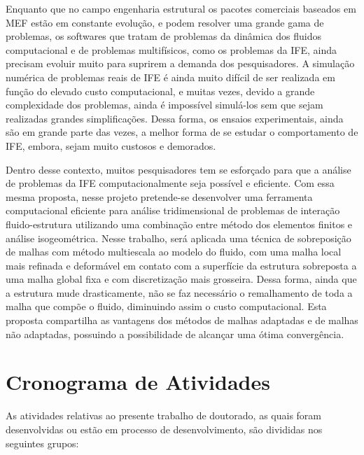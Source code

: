 \documentclass[tese_patricia.tex]{subfiles}
\begin{document}
Enquanto que no campo engenharia estrutural os pacotes comerciais baseados em MEF estão em constante evolução, e podem resolver uma grande gama de problemas, os softwares que tratam de problemas da dinâmica dos fluidos computacional e de problemas multifísicos, como os problemas da IFE, ainda precisam evoluir muito para suprirem a demanda dos pesquisadores. A simulação numérica de problemas reais de IFE é ainda muito difícil de ser realizada em função do elevado custo computacional, e muitas vezes, devido a grande complexidade dos problemas, ainda é impossível simulá-los sem que sejam realizadas grandes simplificações. Dessa forma, os ensaios experimentais, ainda são em grande parte das vezes, a melhor forma de se estudar o comportamento de IFE, embora, sejam muito custosos e demorados.

Dentro desse contexto, muitos pesquisadores tem se esforçado para que a análise de problemas da IFE computacionalmente seja possível e eficiente. Com essa mesma proposta, nesse projeto pretende-se desenvolver uma ferramenta computacional eficiente para análise tridimensional de problemas de interação fluido-estrutura utilizando uma combinação entre método dos elementos finitos e análise isogeométrica.  Nesse trabalho, será aplicada uma técnica de sobreposição de malhas com método multiescala ao modelo do fluido, com uma malha local mais refinada e deformável em contato com a superfície da estrutura sobreposta a uma malha global fixa e com discretização mais grosseira. Dessa forma, ainda que a estrutura mude drasticamente, não se faz necessário o remalhamento de toda a malha que compõe o fluido, diminuindo assim o custo computacional. Esta proposta compartilha as vantagens dos métodos de malhas adaptadas e de malhas não adaptadas, possuindo a possibilidade de alcançar uma ótima convergência.


\section[Cronograma]{Cronograma de Atividades}


As atividades relativas ao presente trabalho de doutorado, as quais foram desenvolvidas ou estão em processo de desenvolvimento, são divididas nos seguintes grupos:
\end{document}
